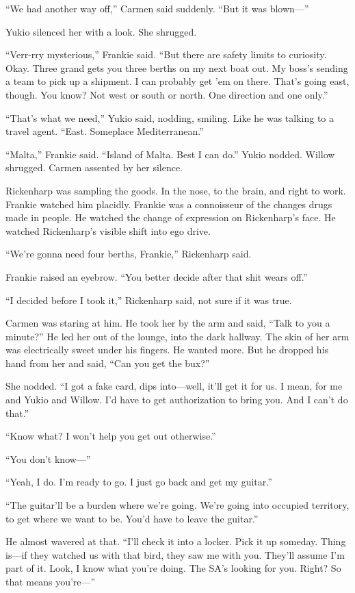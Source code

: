 “We had another way off,” Carmen said suddenly. “But it was blown—”

Yukio silenced her with a look. She shrugged.

“Verr-rry mysterious,” Frankie said. “But there are safety limits to curiosity. Okay. Three grand gets you three berths on my next boat out. My boss’s sending a team to pick up a shipment. I can probably get ’em on there. That’s going east, though. You know? Not west or south or north. One direction and one only.”

“That’s what we need,” Yukio said, nodding, smiling. Like he was talking to a travel agent. “East. Someplace Mediterranean.”

“Malta,” Frankie said. “Island of Malta. Best I can do.” Yukio nodded. Willow shrugged. Carmen assented by her silence.

Rickenharp was sampling the goods. In the nose, to the brain, and right to work. Frankie watched him placidly. Frankie was a connoisseur of the changes drugs made in people. He watched the change of expression on Rickenharp’s face. He watched Rickenharp’s visible shift into ego drive.

“We’re gonna need four berths, Frankie,” Rickenharp said.

Frankie raised an eyebrow. “You better decide after that shit wears off.”

“I decided before I took it,” Rickenharp said, not sure if it was true.

Carmen was staring at him. He took her by the arm and said, “Talk to you a minute?” He led her out of the lounge, into the dark hallway. The skin of her arm was electrically sweet under his fingers. He wanted more. But he dropped his hand from her and said, “Can you get the bux?”

She nodded. “I got a fake card, dips into—well, it’ll get it for us. I mean, for me and Yukio and Willow. I’d have to get authorization to bring you. And I can’t do that.”

“Know what? I won’t help you get out otherwise.”

“You don’t know—”

“Yeah, I do. I’m ready to go. I just go back and get my guitar.”

“The guitar’ll be a burden where we’re going. We’re going into occupied territory, to get where we want to be. You’d have to leave the guitar.”

He almost wavered at that. “I’ll check it into a locker. Pick it up someday. Thing is—if they watched us with that bird, they saw me with you. They’ll assume I’m part of it. Look, I know what you’re doing. The SA’s looking for you. Right? So that means you’re—”

